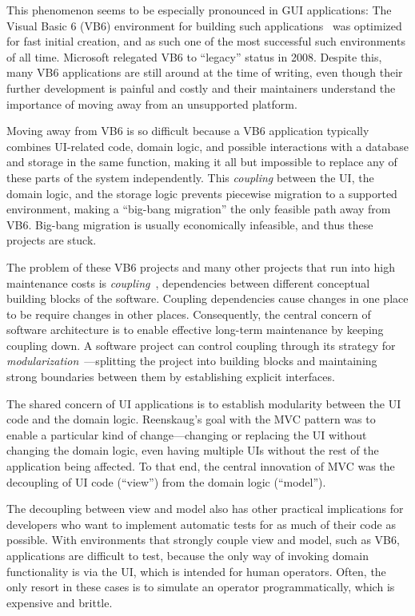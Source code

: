 \documentclass[sigplan,review,screen]{acmart}
\begin{document}
This phenomenon seems to be especially pronounced in GUI applications:
The Visual Basic 6 (VB6) environment for building such
applications~\cite{VB6} was optimized for fast initial creation, and
as such one of the most successful such environments of all time.
Microsoft relegated VB6 to ``legacy'' status in 2008. Despite this,
many VB6 applications are still around at the time of writing, even
though their further development is painful and costly and their
maintainers understand the importance of moving away from an
unsupported platform.

Moving away from VB6 is so difficult because a VB6 application
typically combines UI-related code, domain logic, and possible
interactions with a database and storage in the same function, making it
all but impossible to replace any of these parts of the system
independently.  This \textit{coupling} between the UI, the domain
logic, and the storage logic prevents piecewise migration to a
supported environment, making a ``big-bang migration'' the only
feasible path away from VB6.  Big-bang migration is usually economically
infeasible, and thus these projects are stuck.

The problem of these VB6 projects and many other projects that run
into high maintenance costs is \textit{coupling}~\cite{GreenBook},
dependencies between different conceptual building blocks of the
software. Coupling dependencies cause changes in one place to be require changes in
other places.  Consequently, the central concern of software
architecture is to enable effective long-term maintenance by keeping
coupling down.  A software project can control coupling through its
strategy for \textit{modularization}~\cite{Modularity}---splitting the
project into building blocks and maintaining strong boundaries between
them by establishing explicit interfaces.

The shared concern of UI applications is to establish modularity
between the UI code and the domain logic.  Reenskaug's goal with the
MVC pattern was to enable a particular kind of change---changing or
replacing the UI without changing the domain logic, even having
multiple UIs without the rest of the application being affected.  To
that end, the central innovation of MVC was the decoupling of UI code
(``view'') from the domain logic (``model'').

The decoupling between view and model also has other practical
implications for developers who want to implement automatic tests for
as much of their code as possible.  With environments that strongly
couple view and model, such as VB6, applications are difficult to
test, because the only way of invoking domain functionality is via the
UI, which is intended for human operators.  Often, the only resort in
these cases is to simulate an operator programmatically, which is
expensive and brittle.
\end{document}
